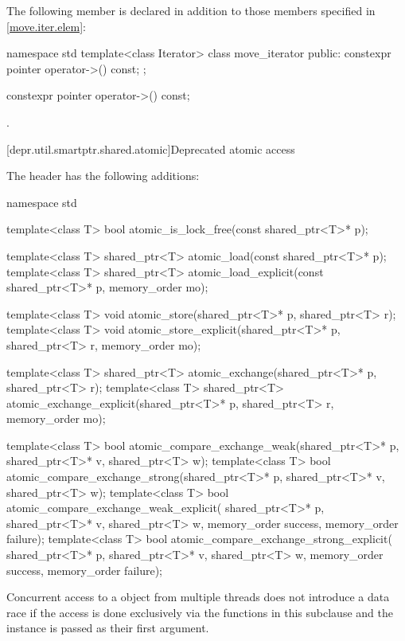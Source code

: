 \pnum
The following member is declared in addition to those members
specified in \ref{move.iter.elem}:
\begin{codeblock}
namespace std {
  template<class Iterator>
  class move_iterator {
  public:
    constexpr pointer operator->() const;
  };
}
\end{codeblock}

%
\begin{itemdecl}
constexpr pointer operator->() const;
\end{itemdecl}

\begin{itemdescr}
\pnum
\returns
{}.
\end{itemdescr}

[depr.util.smartptr.shared.atomic]{Deprecated  atomic access}

\pnum
The header  has the following additions:
%
\begin{codeblock}
namespace std {
  template<class T>
    bool atomic_is_lock_free(const shared_ptr<T>* p);

  template<class T>
    shared_ptr<T> atomic_load(const shared_ptr<T>* p);
  template<class T>
    shared_ptr<T> atomic_load_explicit(const shared_ptr<T>* p, memory_order mo);

  template<class T>
    void atomic_store(shared_ptr<T>* p, shared_ptr<T> r);
  template<class T>
    void atomic_store_explicit(shared_ptr<T>* p, shared_ptr<T> r, memory_order mo);

  template<class T>
    shared_ptr<T> atomic_exchange(shared_ptr<T>* p, shared_ptr<T> r);
  template<class T>
    shared_ptr<T> atomic_exchange_explicit(shared_ptr<T>* p, shared_ptr<T> r, memory_order mo);

  template<class T>
    bool atomic_compare_exchange_weak(shared_ptr<T>* p, shared_ptr<T>* v, shared_ptr<T> w);
  template<class T>
    bool atomic_compare_exchange_strong(shared_ptr<T>* p, shared_ptr<T>* v, shared_ptr<T> w);
  template<class T>
    bool atomic_compare_exchange_weak_explicit(
      shared_ptr<T>* p, shared_ptr<T>* v, shared_ptr<T> w,
      memory_order success, memory_order failure);
  template<class T>
    bool atomic_compare_exchange_strong_explicit(
      shared_ptr<T>* p, shared_ptr<T>* v, shared_ptr<T> w,
      memory_order success, memory_order failure);
}
\end{codeblock}

\pnum
Concurrent access to a  object from multiple threads does not
introduce a data race if the access is done exclusively via the functions in
this subclause and the instance is passed as their first argument.

